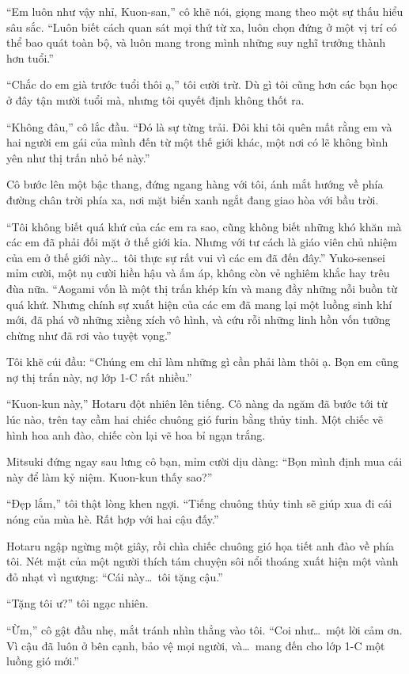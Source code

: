 \documentclass[../main.tex]{subfiles}
\begin{document}
``Em luôn như vậy nhỉ, Kuon-san,'' cô khẽ nói, giọng mang theo một sự thấu hiểu sâu sắc. ``Luôn biết cách quan sát mọi thứ từ xa, luôn chọn đứng ở một vị trí có thể bao quát toàn bộ, và luôn mang trong mình những suy nghĩ trưởng thành hơn tuổi.''

``Chắc do em già trước tuổi thôi ạ,'' tôi cười trừ. Dù gì tôi cũng hơn các bạn học ở đây tận mười tuổi mà, nhưng tôi quyết định không thốt ra.

``Không đâu,'' cô lắc đầu. ``Đó là sự từng trải. Đôi khi tôi quên mất rằng em và hai người em gái của mình đến từ một thế giới khác, một nơi có lẽ không bình yên như thị trấn nhỏ bé này.''

Cô bước lên một bậc thang, đứng ngang hàng với tôi, ánh mắt hướng về phía đường chân trời phía xa, nơi mặt biển xanh ngắt đang giao hòa với bầu trời.

``Tôi không biết quá khứ của các em ra sao, cũng không biết những khó khăn mà các em đã phải đối mặt ở thế giới kia. Nhưng với tư cách là giáo viên chủ nhiệm của em ở thế giới này\dots\ tôi thực sự rất vui vì các em đã đến đây.'' Yuko-sensei mỉm cười, một nụ cười hiền hậu và ấm áp, không còn vẻ nghiêm khắc hay trêu đùa nữa. ``Aogami vốn là một thị trấn khép kín và mang đầy những nỗi buồn từ quá khứ. Nhưng chính sự xuất hiện của các em đã mang lại một luồng sinh khí mới, đã phá vỡ những xiềng xích vô hình, và cứu rỗi những linh hồn vốn tưởng chừng như đã rơi vào tuyệt vọng.''

Tôi khẽ cúi đầu: ``Chúng em chỉ làm những gì cần phải làm thôi ạ. Bọn em cũng nợ thị trấn này, nợ lớp 1-C rất nhiều.''

``Kuon-kun này,'' Hotaru đột nhiên lên tiếng. Cô nàng da ngăm đã bước tới từ lúc nào, trên tay cầm hai chiếc chuông gió furin bằng thủy tinh. Một chiếc vẽ hình hoa anh đào, chiếc còn lại vẽ hoa bỉ ngạn trắng.

Mitsuki đứng ngay sau lưng cô bạn, mỉm cười dịu dàng: ``Bọn mình định mua cái này để làm kỷ niệm. Kuon-kun thấy sao?''

``Đẹp lắm,'' tôi thật lòng khen ngợi. ``Tiếng chuông thủy tinh sẽ giúp xua đi cái nóng của mùa hè. Rất hợp với hai cậu đấy.''

Hotaru ngập ngừng một giây, rồi chìa chiếc chuông gió họa tiết anh đào về phía tôi. Nét mặt của một người thích tám chuyện sôi nổi thoáng xuất hiện một vành đỏ nhạt vì ngượng: ``Cái này\dots\ tôi tặng cậu.''

``Tặng tôi ư?'' tôi ngạc nhiên.

``Ừm,'' cô gật đầu nhẹ, mắt tránh nhìn thẳng vào tôi. ``Coi như\dots\ một lời cảm ơn. Vì cậu đã luôn ở bên cạnh, bảo vệ mọi người, và\dots\ mang đến cho lớp 1-C một luồng gió mới.''
\end{document}
